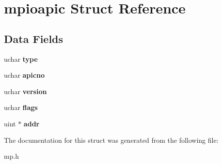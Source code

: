\hypertarget{structmpioapic}{}\section{mpioapic Struct Reference}
\label{structmpioapic}
\subsection*{Data Fields}
\begin{DoxyCompactItemize}
\item 
\mbox{\label{structmpioapic_a8d7527bad798d6f8a59a21df06879f0f}} 
uchar {\bfseries type}
\item 
\mbox{\label{structmpioapic_a9a975b41f6af43937d67c3b63235dd7d}} 
uchar {\bfseries apicno}
\item 
\mbox{\label{structmpioapic_a7c6f3d950f89e2b982fd53f7c59681e7}} 
uchar {\bfseries version}
\item 
\mbox{\label{structmpioapic_a9cc0f4c76312b7d074c558cbcad38a12}} 
uchar {\bfseries flags}
\item 
\mbox{\label{structmpioapic_a364bbba1df7846f9c6d271c7c85a7aaa}} 
uint $\ast$ {\bfseries addr}
\end{DoxyCompactItemize}


The documentation for this struct was generated from the following file\+:\begin{DoxyCompactItemize}
\item 
mp.\+h\end{DoxyCompactItemize}
